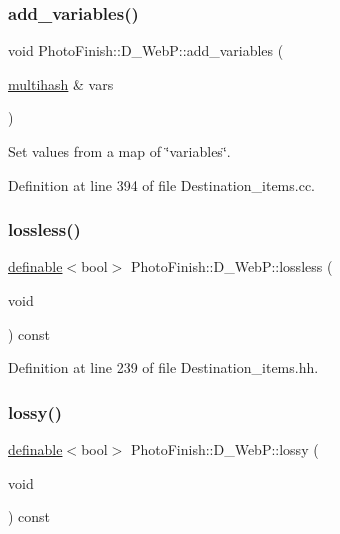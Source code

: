 \subsubsection{\texorpdfstring{add\+\_\+variables()}{add\_variables()}}
{\footnotesize\ttfamily void Photo\+Finish\+::\+D\+\_\+\+Web\+P\+::add\+\_\+variables (\begin{DoxyParamCaption}\item[{\hyperlink{namespace_photo_finish_a6f41796f162687538b7da5c7a95e2d18}{multihash} \&}]{vars }\end{DoxyParamCaption})}



Set values from a map of \char`\"{}variables\char`\"{}. 



Definition at line 394 of file Destination\+\_\+items.\+cc.

\mbox{\label{class_photo_finish_1_1_d___web_p_af4ff4e0d51352703e5a0231ab9beaf41}} 
\subsubsection{\texorpdfstring{lossless()}{lossless()}}
{\footnotesize\ttfamily \hyperlink{class_photo_finish_1_1definable}{definable}$<$bool$>$ Photo\+Finish\+::\+D\+\_\+\+Web\+P\+::lossless (\begin{DoxyParamCaption}\item[{void}]{ }\end{DoxyParamCaption}) const\hspace{0.3cm}{\ttfamily [inline]}}



Definition at line 239 of file Destination\+\_\+items.\+hh.

\mbox{\label{class_photo_finish_1_1_d___web_p_ae2e1a50d282d116ca6a092204c57e20e}} 
\subsubsection{\texorpdfstring{lossy()}{lossy()}}
{\footnotesize\ttfamily \hyperlink{class_photo_finish_1_1definable}{definable}$<$bool$>$ Photo\+Finish\+::\+D\+\_\+\+Web\+P\+::lossy (\begin{DoxyParamCaption}\item[{void}]{ }\end{DoxyParamCaption}) const\hspace{0.3cm}{\ttfamily [inline]}}



